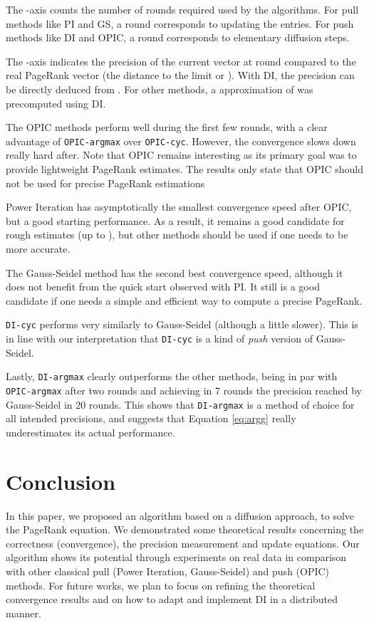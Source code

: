 \documentclass{llncs}
\begin{document}
The -axis counts the number of rounds required used by the algorithms. For pull methods like PI and GS, a round corresponds to updating the  entries. For push methods like DI and OPIC, a round corresponds to  elementary diffusion steps.



The -axis indicates the precision of the current vector  at  round compared to the real PageRank vector  (the distance to the limit or ). With DI, the precision can be directly deduced from . For other methods, a  approximation of  was precomputed using DI.

The OPIC methods perform well during the first few rounds, with a clear advantage of \texttt{OPIC-argmax} over \texttt{OPIC-cyc}. However, the convergence slows down really hard after. Note that OPIC remains interesting as its primary goal was to provide lightweight PageRank estimates. The results only state that OPIC should not be used for precise PageRank estimations

Power Iteration has asymptotically the smallest convergence speed after OPIC, but a good starting performance. As a result, it remains a good candidate for rough estimates (up to ), but other methods should be used if one needs to be more accurate.

The Gauss-Seidel method has the second best convergence speed, although it does not benefit from the quick start observed with PI. It still is a good candidate if one needs a simple and efficient way to compute a precise PageRank.

\texttt{DI-cyc} performs very similarly to Gauss-Seidel (although a little slower). This is in line with our interpretation that \texttt{DI-cyc} is a kind of \emph{push} version of Gauss-Seidel.

Lastly, \texttt{DI-argmax} clearly outperforms the other methods, being in par with \texttt{OPIC-argmax} after two rounds and achieving in 7 rounds the precision reached by Gauss-Seidel in 20 rounds. This shows that \texttt{DI-argmax} is a method of choice for all intended precisions, and suggests that Equation \eqref{eq:argg} really underestimates its actual performance.




\section{Conclusion}
\label{sec:conclusion}
In this paper, we proposed an algorithm based on a diffusion approach, to solve the PageRank equation. We demonstrated some theoretical results concerning the correctness (convergence), the precision measurement and update equations. Our algorithm shows its potential through experiments on real data in comparison with other classical pull (Power Iteration, Gauss-Seidel) and push (OPIC) methods. For future works, we plan to focus on refining the theoretical convergence results and on how to adapt and implement DI in a distributed manner. 


\end{document}

